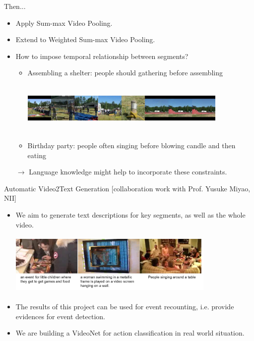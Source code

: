 \documentclass{beamer}
\begin{document}
\begin{frame}[t]{Then...}
\begin{itemize}
\item Apply Sum-max Video Pooling.
\item Extend to Weighted Sum-max Video Pooling.
\item How to impose temporal relationship between segments?

\begin{itemize}
\item Assembling a shelter: people should gathering before assembling
\begin{center}
	\includegraphics[width=10cm,height=2.5cm]{images2/temporal.png}
\end{center}
\item Birthday party: people often singing before blowing candle and then eating
\end{itemize}
$\rightarrow$ Language knowledge might help to incorporate these constraints.	
\end{itemize}
\end{frame}

\begin{frame}[t]{Automatic Video2Text Generation}
	[collaboration work with Prof. Yusuke Miyao, NII]
	\begin{itemize}
		\item We aim to generate text descriptions for key segments, as well as the whole video.
\begin{center}
	\includegraphics[width=10cm,height=3cm]{images2/nlpproject.png}
\end{center}
	\item The results of this project can be used for event recounting, i.e. provide evidences for event detection.
	\item We are building a VideoNet for action classification in real world situation.		
	\end{itemize}
\end{frame}
	
\end{document}

